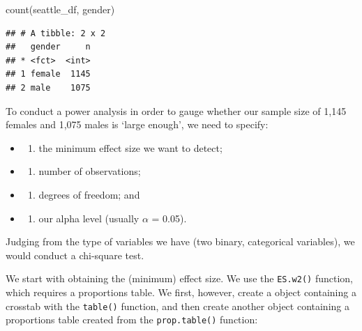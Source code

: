 \documentclass[
]{book}
\newenvironment{Shaded}{\begin{snugshade}}{\end{snugshade}}
\newcommand{\FunctionTok}[1]{\textcolor[rgb]{0.00,0.00,0.00}{#1}}
\newcommand{\NormalTok}[1]{#1}
\providecommand{\tightlist}{%
  \setlength{\itemsep}{0pt}\setlength{\parskip}{0pt}}
\begin{document}
\begin{Shaded}
\begin{Highlighting}[]
\FunctionTok{count}\NormalTok{(seattle\_df, gender)}
\end{Highlighting}
\end{Shaded}

\begin{verbatim}
## # A tibble: 2 x 2
##   gender     n
## * <fct>  <int>
## 1 female  1145
## 2 male    1075
\end{verbatim}

To conduct a power analysis in order to gauge whether our sample size of 1,145 females and 1,075 males is `large enough', we need to specify:

\begin{itemize}
\item
  \begin{enumerate}
  \def\labelenumi{(\alph{enumi})}
  \tightlist
  \item
    the minimum effect size we want to detect;
  \end{enumerate}
\item
  \begin{enumerate}
  \def\labelenumi{(\alph{enumi})}
  \setcounter{enumi}{1}
  \tightlist
  \item
    number of observations;
  \end{enumerate}
\item
  \begin{enumerate}
  \def\labelenumi{(\alph{enumi})}
  \setcounter{enumi}{2}
  \tightlist
  \item
    degrees of freedom; and
  \end{enumerate}
\item
  \begin{enumerate}
  \def\labelenumi{(\alph{enumi})}
  \setcounter{enumi}{3}
  \tightlist
  \item
    our alpha level (usually \(\alpha\) = 0.05).
  \end{enumerate}
\end{itemize}

Judging from the type of variables we have (two binary, categorical variables), we would conduct a chi-square test.

We start with obtaining the (minimum) effect size. We use the \texttt{ES.w2()} function, which requires a proportions table. We first, however, create a object containing a crosstab with the \texttt{table()} function, and then create another object containing a proportions table created from the \texttt{prop.table()} function:
\end{document}
